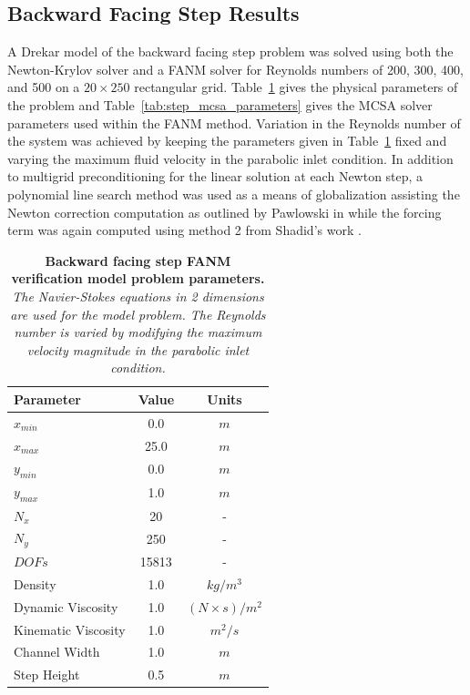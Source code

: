 \clearpage

\subsection{Backward Facing Step Results}
\label{subsec:backward_step_verification}

A Drekar model of the backward facing step problem was solved using
both the Newton-Krylov solver and a FANM solver for Reynolds numbers
of 200, 300, 400, and 500 on a $20 \times 250$ rectangular
grid. Table~\ref{tab:backward_step_parameters} gives the physical
parameters of the problem and Table~\ref{tab:step_mcsa_parameters}
gives the MCSA solver parameters used within the FANM
method. Variation in the Reynolds number of the system was achieved by
keeping the parameters given in
Table~\ref{tab:backward_step_parameters} fixed and varying the maximum
fluid velocity in the parabolic inlet condition. In addition to
multigrid preconditioning for the linear solution at each Newton step,
a polynomial line search method was used as a means of globalization
assisting the Newton correction computation as outlined by Pawlowski
in \citep{pawlowski_globalization_2006} while the forcing term was
again computed using method 2 from Shadid's work
\citep{shadid_inexact_1997}.

\begin{table}[h!]
  \begin{center}
    \begin{tabular}{lcc}\hline\hline
      \multicolumn{1}{l}{Parameter}& 
      \multicolumn{1}{c}{Value}&
      \multicolumn{1}{c}{Units}\\\hline
      $x_{min}$ & 0.0 & $m$ \\
      $x_{max}$ & 25.0 & $m$ \\
      $y_{min}$ & 0.0 & $m$ \\
      $y_{max}$ & 1.0 & $m$ \\
      $N_x$ & 20 & - \\
      $N_y$ & 250 & - \\
      $DOFs$ & 15813 & - \\
      Density & 1.0 & $kg / m^3$ \\
      Dynamic Viscosity & 1.0 & $(N \times s) / m^2$ \\
      Kinematic Viscosity & 1.0 & $m^2 / s$ \\
      Channel Width & 1.0 & $m$ \\
      Step Height & 0.5 & $m$ \\
      \hline\hline
    \end{tabular}
  \end{center}
  \caption{\textbf{Backward facing step FANM verification model
      problem parameters.}  \textit{The Navier-Stokes equations in 2
      dimensions are used for the model problem. The Reynolds number
      is varied by modifying the maximum velocity magnitude in the
      parabolic inlet condition.}}
  \label{tab:backward_step_parameters}
\end{table}

